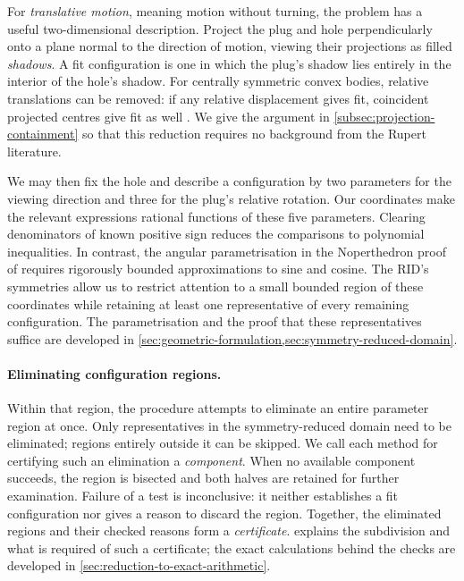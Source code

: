 For \emph{translative motion}, meaning motion without turning, the problem
has a useful two-dimensional description.
Project the plug and hole perpendicularly onto a plane normal to the direction
of motion, viewing their projections as filled \emph{shadows}. A fit configuration
is one in which the plug's shadow lies entirely in the interior of the hole's shadow.
For centrally symmetric convex bodies, relative translations can be removed:
if any relative displacement gives fit, coincident projected centres give
fit as well \citep{SteiningerYurkevich2023}. We give the argument in
\cref{subsec:projection-containment} so that this reduction requires no
background from the Rupert literature.

We may then fix the hole and describe a configuration by two parameters for
the viewing direction and three for the plug's relative rotation.
Our coordinates make the relevant expressions rational functions of these
five parameters. Clearing denominators of known positive sign reduces the
comparisons to polynomial inequalities. In contrast, the angular
parametrisation in the Noperthedron proof of
\citet[Section~6.1]{SteiningerYurkevichNopertV2} requires rigorously bounded
approximations to sine and cosine.
The RID's symmetries allow us to restrict attention to a small bounded
region of these coordinates while retaining at least one representative of
every remaining configuration. The parametrisation and the proof that these
representatives suffice are developed in
\cref{sec:geometric-formulation,sec:symmetry-reduced-domain}.

\paragraph{Eliminating configuration regions.}
Within that region, the procedure attempts to eliminate an entire parameter
region at once. Only representatives in the symmetry-reduced domain need to
be eliminated; regions entirely outside it can be skipped.
We call each method for certifying such an elimination a \emph{component}.
When no available component succeeds, the region is bisected
and both halves are retained for further examination. Failure of a test is
inconclusive: it neither establishes a fit configuration nor gives a reason
to discard the region. Together, the eliminated regions and their checked
reasons form a \emph{certificate}. 
explains the subdivision and what is required of such a certificate;
the exact calculations behind the checks are developed in
\cref{sec:reduction-to-exact-arithmetic}.

